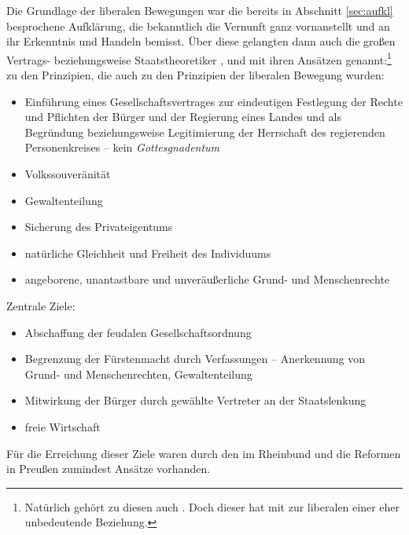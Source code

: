 Die Grundlage der liberalen Bewegungen war die bereits in Abschnitt
\ref{sec:aufkl} besprochene Aufklärung, die bekanntlich die Vernunft
ganz vornanstellt und an ihr Erkenntnis und Handeln bemisst. Über
diese gelangten dann auch die großen Vertrags- beziehungsweise
Staatstheoretiker ,  und   mit ihren Ansätzen
genannt:\footnote{Natürlich gehört zu diesen auch . Doch dieser hat mit zur liberalen einer eher
unbedeutende Beziehung.} zu den Prinzipien, die auch zu den Prinzipien
der liberalen Bewegung wurden:

\begin{itemize}
\item Einführung eines Gesellschaftsvertrages zur eindeutigen
Festlegung der Rechte und Pflichten der Bürger und der Regierung eines
Landes und als Begründung beziehungsweise Legitimierung der Herrschaft
des regierenden Personenkreises -- kein \emph{Gottesgnadentum}
\item Volkssouveränität
\item Gewaltenteilung
\item Sicherung des Privateigentums
\item natürliche Gleichheit und Freiheit des Individuums
\item angeborene, unantastbare und unveräußerliche Grund- und
Menschenrechte
\end{itemize}


\noindent Zentrale Ziele:

\begin{itemize}
\item Abschaffung der feudalen Gesellschaftsordnung 
\item Begrenzung der Fürstenmacht durch Verfassungen -- Anerkennung
von Grund- und Menschenrechten, Gewaltenteilung
\item Mitwirkung der Bürger durch gewählte Vertreter an der
Staatslenkung
\item freie Wirtschaft
\end{itemize}

Für die Erreichung dieser Ziele waren durch den  im
Rheinbund und die Reformen in Preußen zumindest Ansätze vorhanden.


